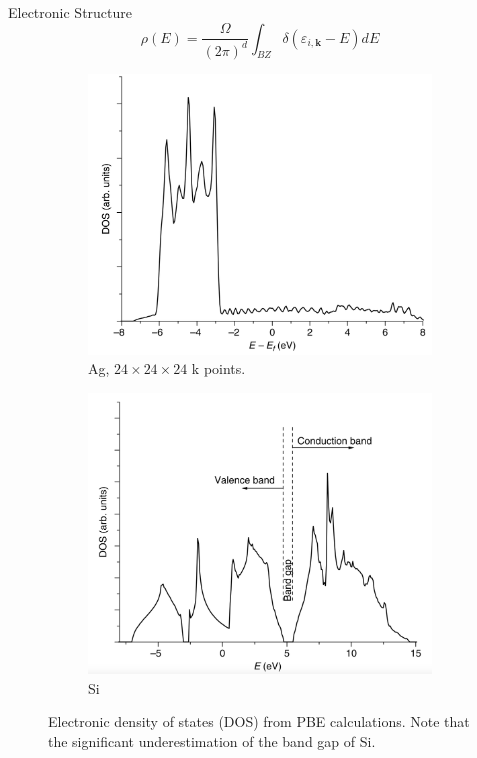 \documentclass[aspectratio=169]{beamer}
\let \vec \mathbf
\begin{document}
\begin{frame}{Electronic Structure}
\begin{equation*}
    \rho(E) = \frac{\Omega}{(2\pi)^d} \int_{BZ} \delta(\varepsilon_{i, \vec{k}}-E) dE
\end{equation*}

\begin{figure}
    \centering
    \begin{subfigure}{0.3\textwidth}
        \centering
        \includegraphics[width=\linewidth]{lectures/figures/8_DOS_Ag.png}
    \caption{Ag, $24 \times 24 \times 24$ k points.}
    \end{subfigure}
    \begin{subfigure}{0.3\textwidth}
        \centering
        \includegraphics[width=\linewidth]{lectures/figures/8_DOS_Si.png}
    \caption{Si}
    \end{subfigure}
    \caption{Electronic density of states (DOS) from PBE calculations.\cite{shollDensityFunctionalTheory2009} Note that the significant underestimation of the band gap of Si.}
    \label{fig}
\end{figure} 
\end{frame} 
\end{document}
